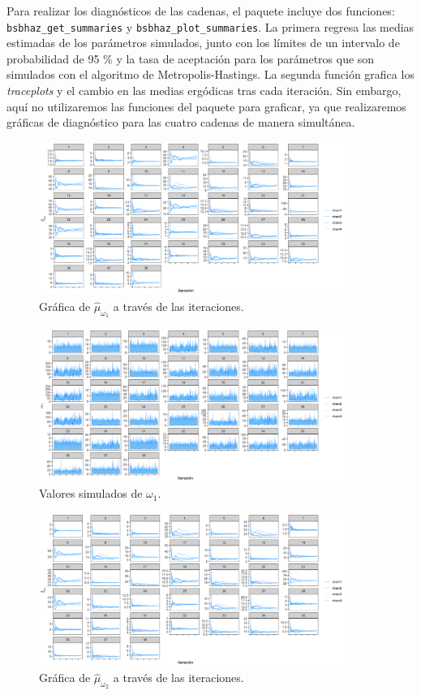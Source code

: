 \documentclass[11pt,a4paper]{article}
\begin{document}
Para realizar los diagnósticos de las cadenas, el paquete incluye dos funciones: \texttt{bsbhaz\_get\_summaries} y \texttt{bsbhaz\_plot\_summaries}. La primera regresa las medias estimadas de los parámetros simulados, junto con los límites de un intervalo de probabilidad de 95 \% y la tasa de aceptación para los parámetros que son simulados con el algoritmo de Metropolis-Hastings. La segunda función grafica los \textit{traceplots} y el cambio en las medias ergódicas tras cada iteración. Sin embargo, aquí no utilizaremos las funciones del paquete para graficar, ya que realizaremos gráficas de diagnóstico para las cuatro cadenas de manera simultánea.\\

\begin{figure}
\centering\includegraphics[width=10cm]{ergodic_means_omega1.png}
\caption{Gráfica de $\hat{\mu}_{\omega_1}$ a través de las iteraciones.}
\label{fig:ergodic_means_omega1}
\end{figure}

\begin{figure}
\centering\includegraphics[width=10cm]{traceplots_omega1.png}
\caption{Valores simulados de $\omega_1$.}
\label{fig:traceplot_omega1}
\end{figure}

\begin{figure}
\centering\includegraphics[width=10cm]{ergodic_means_omega2.png}
\caption{Gráfica de $\hat{\mu}_{\omega_2}$ a través de las iteraciones.}
\label{fig:ergodic_means_omega2}
\end{figure}
\end{document}
